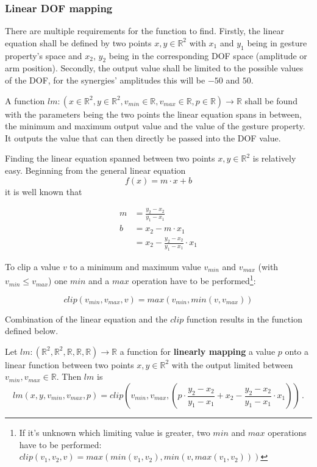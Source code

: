 \subsubsection{Linear DOF mapping}

There are multiple requirements for the function to find. Firstly, the linear equation shall be defined by two points $x, y \in \mathbb{R}^2$ with $x_1$ and $y_1$ being in gesture property's space and $x_2$, $y_2$ being in the corresponding DOF space (amplitude or arm position). Secondly, the output value shall be limited to the possible values of the DOF, for the synergies' amplitudes this will be $-50$ and $50$.

A function $lm:(x \in \mathbb{R}^2, y \in \mathbb{R}^2, v_{min} \in \mathbb{R}, v_{max} \in \mathbb{R}, p \in \mathbb{R}) \rightarrow \mathbb{R}$ shall be found with the parameters being the two points the linear equation spans in between, the minimum and maximum output value and the value of the gesture property. It outputs the value that can then directly be passed into the DOF value.

Finding the linear equation spanned between two points $x, y \in \mathbb{R}^2$ is relatively easy. Beginning from the general linear equation
\begin{equation*}
f(x) = m \cdot x + b
\end{equation*}
it is well known that

\begin{align*}
m &= \frac{y_2 - x_2}{y_1 - x_1} \\
b &= x_2 - m \cdot x_1  \\
&= x_2 - \frac{y_2 - x_2}{y_1 - x_1} \cdot x_1
\end{align*}

To clip a value $v$ to a minimum and maximum value $v_{min}$ and $v_{max}$ (with $v_{min} \leq v_{max}$) one $min$ and a $max$ operation have to be performed\footnote{If it's unknown which limiting value is greater, two $min$ and $max$ operations have to be performed: $clip(v_1, v_2, v) = max(min(v_1, v_2), min(v, max(v_1, v_2)))$}:

\begin{equation*}
clip(v_{min}, v_{max}, v) = max(v_{min}, min(v, v_{max}))
\end{equation*}

Combination of the linear equation and the $clip$ function results in the function defined below.

\begin{defn} Let $lm : (\mathbb{R}^2, \mathbb{R}^2, \mathbb{R}, \mathbb{R}, \mathbb{R}) \rightarrow \mathbb{R}$ a function for \textbf{linearly mapping} a value $p$ onto a linear function between two points $x, y \in \mathbb{R}^2$ with the output limited between $v_{min}, v_{max} \in \mathbb{R}$. Then $lm$ is
\begin{equation}
\label{eq:lm}
lm(x, y, v_{min}, v_{max}, p) = clip\left(v_{min}, v_{max}, \left( p \cdot \frac{y_2 - x_2}{y_1 - x_1} + x_2 - \frac{y_2 - x_2}{y_1 - x_1} \cdot x_1 \right)\right) \, .
\end{equation}
\end{defn}


